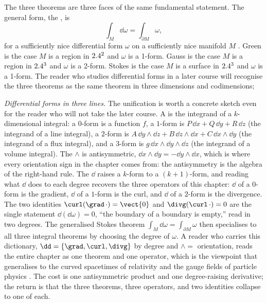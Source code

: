 The three theorems are three faces of the same fundamental statement.
The general form, the , is
\[
\int_{M} \dd\omega = \int_{\partial M} \omega,
\]
for a sufficiently nice differential form $\omega$ on a sufficiently
nice manifold $M$ \cite{text:strang2016}. Green is the case $M$ is a
region in $2.4^{2}$ and $\omega$ is a 1-form. Gauss is the case $M$ is
a region in $2.4^{3}$ and $\omega$ is a 2-form. Stokes is the case
$M$ is a surface in $2.4^{3}$ and $\omega$ is a 1-form. The reader
who studies differential forms in a later course will recognise the
three theorems as the same theorem in three dimensions and codimensions;

\begin{mastery}
\textit{Differential forms in three lines.} The unification is worth a
concrete sketch even for the reader who will not take the later course.
A  is the integrand of a $k$-dimensional
integral: a $0$-form is a function $f$, a $1$-form is $P\,\dd x +
Q\,\dd y + R\,\dd z$ (the integrand of a line integral), a $2$-form is
$A\,\dd y\wedge\dd z + B\,\dd z\wedge\dd x + C\,\dd x\wedge\dd y$ (the
integrand of a flux integral), and a $3$-form is $g\,\dd x\wedge\dd y
\wedge\dd z$ (the integrand of a volume integral). The
 $\wedge$ is antisymmetric, $\dd x\wedge\dd y =
-\dd y\wedge\dd x$, which is where every orientation sign in the
chapter comes from: the antisymmetry is the algebra of the right-hand
rule. The  $\dd$ raises a $k$-form to a
$(k{+}1)$-form, and reading what $\dd$ does to each degree recovers the
three operators of this chapter: $\dd$ of a $0$-form is the gradient,
$\dd$ of a $1$-form is the curl, and $\dd$ of a $2$-form is the
divergence. The two identities $\curl(\grad\,\cdot) = \vect{0}$ and
$\divg(\curl\,\cdot) = 0$ are the single statement $\dd(\dd\omega) = 0$,
``the boundary of a boundary is empty,'' read in two degrees. The
generalised Stokes theorem $\int_{M}\dd\omega = \int_{\partial M}
\omega$ then specialises to all three integral theorems by choosing the
degree of $\omega$. A reader who carries this dictionary, $\dd =
\{\grad, \curl, \divg\}$ by degree and $\wedge =$ orientation, reads
the entire chapter as one theorem and one operator, which is the
viewpoint that generalises to the curved spacetimes of relativity and
the gauge fields of particle physics \cite{text:strang2016}. The cost
is one antisymmetric product and one degree-raising derivative; the
return is that the three theorems, three operators, and two identities
collapse to one of each.
\end{mastery}

